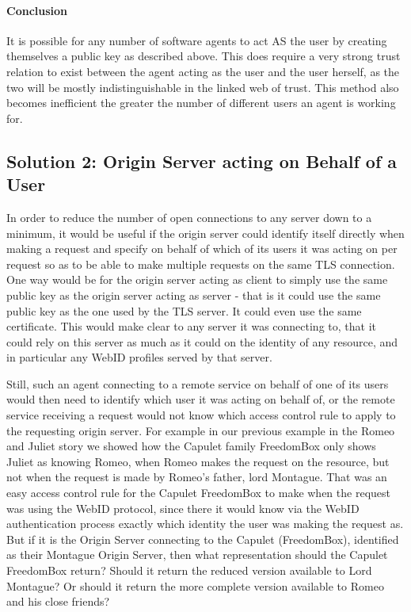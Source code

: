 \documentclass[a4paper]{llncs}
\begin{document}
\paragraph{Conclusion}

It is possible for any number of software agents to act AS the user by creating themselves a public key as described above.
This does require a very strong trust relation to exist between the agent acting as the user and the user herself, as the two will be mostly indistinguishable in the linked web of trust. 
This method also becomes inefficient the greater the number of different users  an agent is working for.

 
\subsection{Solution 2: Origin Server acting on Behalf of a User}

In order to reduce the number of open connections to any server down to a minimum, it would be useful if the origin server could identify itself directly when making a request and specify on behalf of which of its users it was acting on per request so as to be able to make multiple requests on the same TLS connection.
One way would be for the origin server acting as client to simply use the same public key as the origin server acting as server - that is it could use the same public key as the one used by the TLS server.
It could even use the same certificate.
This would make clear to any server it was connecting to, that it could rely on this server as much as it could on the identity of any resource, and in particular any WebID profiles served by that server.

Still, such an agent connecting to a remote service on behalf of one of its users would then need to identify which user it was acting on behalf of, or the remote service receiving a request would not know which access control rule to apply to the requesting origin server.
For example in our previous example in the Romeo and Juliet story we showed how the Capulet family FreedomBox only shows Juliet as knowing Romeo, when Romeo makes the request on the resource, but not when the request is made by Romeo's father, lord Montague.
That was an easy access control rule for the Capulet FreedomBox to make when the request was using the WebID protocol, since there it would know via the WebID authentication process exactly which identity the user was making the request as. 
But if it is the Origin Server connecting to the Capulet (FreedomBox), identified as their Montague Origin Server, then what representation should the Capulet FreedomBox return? 
Should it return the reduced version available to Lord Montague?
Or should it return the more complete version available to Romeo and his close friends?
\end{document}
